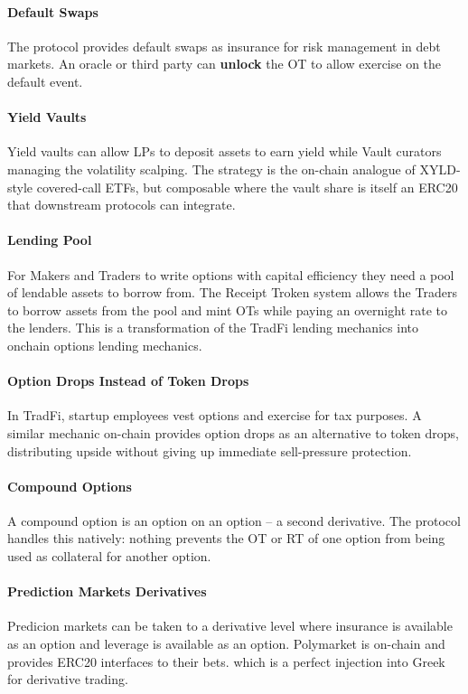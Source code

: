 \documentclass[%
 reprint,
 amsmath,amssymb,
 aps,
 prl,
floatfix,
]{revtex4-2}
\begin{document}
\paragraph*{Default Swaps}
The protocol provides default swaps as insurance for risk management in debt markets.
An oracle or third party can \textbf{unlock} the OT to allow exercise on the
default event.

\paragraph*{Yield Vaults}
Yield vaults can allow LPs to deposit assets to earn yield while Vault curators managing the volatility scalping. 
The strategy is the on-chain analogue of XYLD-style covered-call ETFs, 
but composable where the vault share is itself an ERC20 that downstream protocols can integrate.

\paragraph*{Lending Pool}
For Makers and Traders to write options with capital efficiency they need a pool of lendable assets to borrow from.
The Receipt Troken system allows the Traders to borrow assets from the pool and mint OTs while paying an overnight rate to the lenders.
This is a transformation of the TradFi lending mechanics into onchain options lending mechanics.

\paragraph*{Option Drops Instead of Token Drops}
In TradFi, startup employees vest options and exercise for tax purposes. A similar
mechanic on-chain provides option drops as an alternative to token drops, distributing
upside without giving up immediate sell-pressure protection.

\paragraph*{Compound Options}
A compound option is an option on an option -- a second derivative. The protocol
handles this natively: nothing prevents the OT or RT of one option from being used
as collateral for another option.

\paragraph*{Prediction Markets Derivatives}
Predicion markets can be taken to a derivative level where insurance is available as an option and leverage is available as an option. 
Polymarket is on-chain and provides ERC20 interfaces to their bets. which is a perfect injection into Greek for derivative trading.
\end{document}
